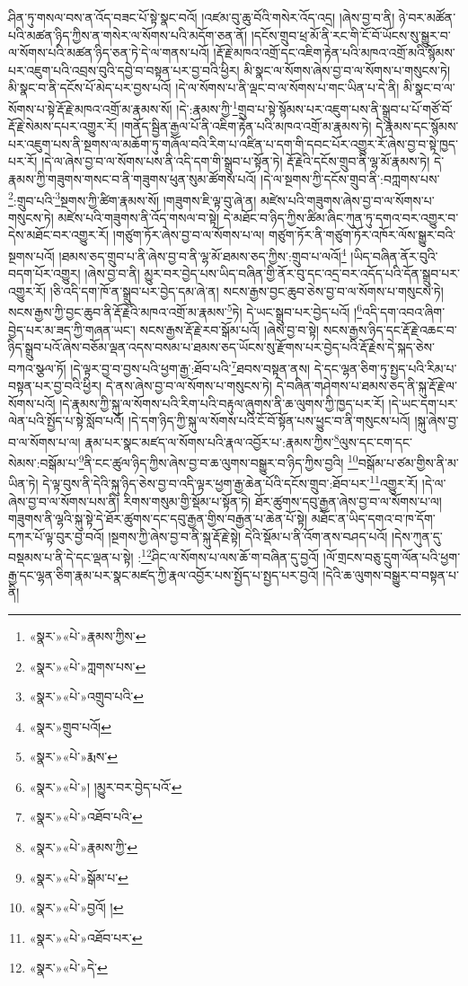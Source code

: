 ཤིན་ཏུ་གསལ་བས་ན་འོད་བཟང་པོ་སྟེ་སྣང་བའོ། །འཛམ་བུ་ཆུ་བོའི་གསེར་འོད་འདྲ། །ཞེས་བྱ་བ་ནི། ཉེ་བར་མཚོན་པའི་མཚན་ཉིད་ཀྱིས་ན་གསེར་ལ་སོགས་པའི་མདོག་ཅན་ནོ། །དངོས་གྲུབ་ཕྲ་མོ་ནི་རང་གི་ངོ་བོ་ཡོངས་སུ་སྒྱུར་བ་ལ་སོགས་པའི་མཚན་ཉིད་ཅན་ཏེ་དེ་ལ་གནས་པའོ། །རྡོ་རྗེ་མཁའ་འགྲོ་དང་འཇིག་རྟེན་པའི་མཁའ་འགྲོ་མའི་སྙོམས་པར་འཇུག་པའི་འབྲས་བུའི་དབྱེ་བ་བསྟན་པར་བྱ་བའི་ཕྱིར། མི་སྣང་ལ་སོགས་ཞེས་བྱ་བ་ལ་སོགས་པ་གསུངས་ཏེ། མི་སྣང་བ་ནི་དངོས་པོ་མེད་པར་བྱས་པའོ། །དེ་ལ་སོགས་པ་ནི་ལྡང་བ་ལ་སོགས་པ་གང་ཡིན་པ་དེ་ནི། མི་སྣང་བ་ལ་སོགས་པ་སྟེ་རྡོ་རྗེ་མཁའ་འགྲོ་མ་རྣམས་སོ། །དེ་:རྣམས་ཀྱི་\footnote{«སྣར་»«པེ་»རྣམས་ཀྱིས་}གྲུབ་པ་སྟེ་སྙོམས་པར་འཇུག་པས་ནི་སྒྲུབ་པ་པོ་གཙོ་བོ་རྡོ་རྗེ་སེམས་དཔར་འགྱུར་རོ། །གནོད་སྦྱིན་རྒྱལ་པོ་ནི་འཇིག་རྟེན་པའི་མཁའ་འགྲོ་མ་རྣམས་ཏེ། དེ་རྣམས་དང་སྙོམས་པར་འཇུག་པས་ནི་སྔགས་ལ་མཆོག་ཏུ་གཞོལ་བའི་རིག་པ་འཛིན་པ་དག་གི་དབང་པོར་འགྱུར་རོ་ཞེས་བྱ་བ་སྟེ་ཁྱད་པར་རོ། །དེ་ལ་ཞེས་བྱ་བ་ལ་སོགས་པས་ནི་འདི་དག་གི་སྒྲུབ་པ་སྟོན་ཏེ། རྡོ་རྗེའི་དངོས་གྲུབ་ནི་ལྷ་མོ་རྣམས་ཏེ། དེ་རྣམས་ཀྱི་གཟུགས་གསང་བ་ནི་གཟུགས་ཕུན་སུམ་ཚོགས་པའོ། །དེ་ལ་སྔགས་ཀྱི་དངོས་གྲུབ་ནི་:བཀླགས་པས་\footnote{«སྣར་»«པེ་»ཀླགས་པས་}:གྲུབ་པའི་\footnote{«སྣར་»«པེ་»འགྲུབ་པའི་}སྔགས་ཀྱི་ཚིག་རྣམས་སོ། །གཟུགས་ཇི་ལྟ་བུ་ཞེ་ན། མཛེས་པའི་གཟུགས་ཞེས་བྱ་བ་ལ་སོགས་པ་གསུངས་ཏེ། མཛེས་པའི་གཟུགས་ནི་འོད་གསལ་བ་སྟེ། དེ་མཐོང་བ་ཉིད་ཀྱིས་ཚིམ་ཞིང་ཀུན་ཏུ་དགའ་བར་འགྱུར་བ་དེས་མཐོང་བར་འགྱུར་རོ། །གཙུག་ཏོར་ཞེས་བྱ་བ་ལ་སོགས་པ་ལ། གཙུག་ཏོར་ནི་གཙུག་ཏོར་འཁོར་ལོས་སྒྱུར་བའི་སྔགས་པའོ། །ཐམས་ཅད་གྲུབ་པ་ནི་ཞེས་བྱ་བ་ནི་ལྷ་མོ་ཐམས་ཅད་ཀྱིས་:གྲུབ་པ་ལའོ།\footnote{«སྣར་»གྲུབ་པའོ།} །ཡིད་བཞིན་ནོར་བུའི་བདག་པོར་འགྱུར། །ཞེས་བྱ་བ་ནི། མྱུར་བར་བྱེད་པས་ཡིད་བཞིན་གྱི་ནོར་བུ་དང་འདྲ་བར་འདོད་པའི་དོན་སྒྲུབ་པར་འགྱུར་རོ། །ཅི་འདི་དག་ཁོ་ན་སྒྲུབ་པར་བྱེད་དམ་ཞེ་ན། སངས་རྒྱས་བྱང་ཆུབ་ཅེས་བྱ་བ་ལ་སོགས་པ་གསུངས་ཏེ། སངས་རྒྱས་ཀྱི་བྱང་ཆུབ་ནི་རྡོ་རྗེའི་མཁའ་འགྲོ་མ་རྣམས་\footnote{«སྣར་»«པེ་»རྨས་}ཏེ། དེ་ཡང་སྒྲུབ་པར་བྱེད་པའོ། །\footnote{«སྣར་»«པེ་»། །མྱུར་བར་བྱེད་པའོ་}འདི་དག་འབའ་ཞིག་བྱེད་པར་མ་ཟད་ཀྱི་གཞན་ཡང་། སངས་རྒྱས་རྡོ་རྗེ་རབ་སྒོམ་པའོ། །ཞེས་བྱ་བ་སྟེ། སངས་རྒྱས་ཉིད་དང་རྡོ་རྗེ་འཆང་བ་ཉིད་སྒྲུབ་པའོ་ཞེས་བཅོམ་ལྡན་འདས་བསམ་པ་ཐམས་ཅད་ཡོངས་སུ་རྫོགས་པར་བྱེད་པའི་རྡོ་རྗེས་དེ་སྐད་ཅེས་བཀའ་སྩལ་ཏོ། །དེ་ལྟར་བྱ་བ་བྱས་པའི་ཕྱག་རྒྱ་:ཐོབ་པའི་\footnote{«སྣར་»«པེ་»འཐོབ་པའི་}ཐབས་བསྟན་ནས། དེ་དང་ལྷན་ཅིག་ཏུ་སྤྱད་པའི་རིམ་པ་བསྟན་པར་བྱ་བའི་ཕྱིར། དེ་ནས་ཞེས་བྱ་བ་ལ་སོགས་པ་གསུངས་ཏེ། དེ་བཞིན་གཤེགས་པ་ཐམས་ཅད་ནི་སྐུ་རྡོ་རྗེ་ལ་སོགས་པའོ། །དེ་རྣམས་ཀྱི་སྐུ་ལ་སོགས་པའི་རིག་པའི་བརྟུལ་ཞུགས་ནི་ཆ་ལུགས་ཀྱི་ཁྱད་པར་རོ། །དེ་ཡང་དག་པར་ལེན་པའི་སྤྱོད་པ་སྟེ་སློབ་པའོ། །དེ་དག་ཉིད་ཀྱི་སྐུ་ལ་སོགས་པའི་ངོ་བོ་སྟོན་པས་ཕྱུང་བ་ནི་གསུངས་པའོ། །སྐུ་ཞེས་བྱ་བ་ལ་སོགས་པ་ལ། རྣམ་པར་སྣང་མཛད་ལ་སོགས་པའི་རྣལ་འབྱོར་པ་:རྣམས་ཀྱིས་\footnote{«སྣར་»«པེ་»རྣམས་ཀྱི་}ལུས་དང་ངག་དང་སེམས་:བསྒོམ་པ་\footnote{«སྣར་»«པེ་»སྒོམ་པ་}ནི་ངང་ཚུལ་ཉིད་ཀྱིས་ཞེས་བྱ་བ་ཆ་ལུགས་བསྒྱུར་བ་ཉིད་ཀྱིས་བྱའི། \footnote{«སྣར་»«པེ་»བྱའོ། ། }བསྒོམ་པ་ཙམ་གྱིས་ནི་མ་ཡིན་ཏེ། དེ་ལྟ་བུས་ནི་དེའི་སྐུ་ཉིད་ཅེས་བྱ་བ་འདི་ལྟར་ཕྱག་རྒྱ་ཆེན་པོའི་དངོས་གྲུབ་:ཐོབ་པར་\footnote{«སྣར་»«པེ་»འཐོབ་པར་}འགྱུར་རོ། །དེ་ལ་ཞེས་བྱ་བ་ལ་སོགས་པས་ནི། རིགས་གསུམ་གྱི་སྡོམ་པ་སྟོན་ཏེ། ཐོར་ཚུགས་དབུ་རྒྱན་ཞེས་བྱ་བ་ལ་སོགས་པ་ལ། གཟུགས་ནི་ལྷའི་སྐུ་སྟེ་དེ་ཐོར་ཚུགས་དང་དབུ་རྒྱན་གྱིས་བརྒྱན་པ་ཆེན་པོ་སྟེ། མཐོང་ན་ཡིད་དགའ་བ་ཁ་དོག་དཀར་པོ་ལྟ་བུར་བྱ་བའོ། །སྔགས་ཀྱི་ཞེས་བྱ་བ་ནི་སྐུ་རྡོ་རྗེ་སྟེ། དེའི་སྡོམ་པ་ནི་འོག་ནས་བཤད་པའོ། །དེས་ཀུན་དུ་བསྡམས་པ་ནི་དེ་དང་ལྡན་པ་སྟེ། :\footnote{«སྣར་»«པེ་»དེ་}ཤིང་ལ་སོགས་པ་ལས་ཆོ་ག་བཞིན་དུ་བྱའོ། །ལོ་གྲངས་བཅུ་དྲུག་ལོན་པའི་ཕྱག་རྒྱ་དང་ལྷན་ཅིག་རྣམ་པར་སྣང་མཛད་ཀྱི་རྣལ་འབྱོར་པས་སྤྱོད་པ་སྤྱད་པར་བྱའོ། །དེའི་ཆ་ལུགས་བསྒྱུར་བ་བསྟན་པ་ནི། 